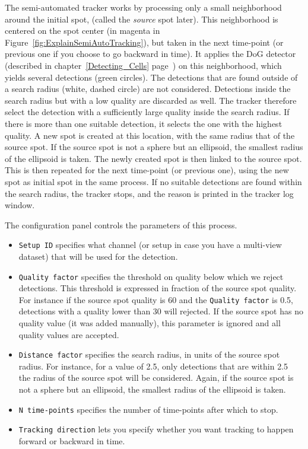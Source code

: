 The semi-automated tracker works by processing only a small neighborhood around the initial spot, (called the \textit{source} spot later).
This neighborhood is centered on the spot center (in magenta in Figure~\ref{fig:ExplainSemiAutoTracking}), but taken in the next time-point (or previous one if you choose to go backward in time).
It applies the DoG detector (described in chapter~\ref{Detecting_Cells} page~\pageref{Detection_Cells_DoG_Detector}) on this neighborhood, which yields several detections (green circles).
The detections that are found outside of a search radius (white, dashed circle) are not considered.
Detections inside the search radius but with a low quality are discarded as well.
The tracker therefore select the detection with a sufficiently large quality inside the search radius. 
If there is more than one suitable detection, it selects the one with the highest quality.
A new spot is created at this location, with the same radius that of the source spot. 
If the source spot is not a sphere but an ellipsoid, the smallest radius of the ellipsoid is taken. 
The newly created spot is then linked to the source spot. 
This is then repeated for the next time-point (or previous one), using the new spot as initial spot in the same process.
If no suitable detections are found within the search radius, the tracker stops, and the reason is printed in the tracker log window.

The configuration panel controls the parameters of this process.
\begin{itemize}
    
    \item \texttt{Setup ID} specifies what channel (or setup in case you have a multi-view dataset) that will be used for the detection.
    
    \item \texttt{Quality factor} specifies the threshold on quality below which we reject detections. This threshold is expressed in fraction of the source spot quality. For instance if the source spot quality is 60 and the \texttt{Quality factor} is 0.5, detections with a quality lower than 30 will rejected. If the source spot has no quality value (it was added manually), this parameter is ignored and all quality values are accepted.
    
    \item \texttt{Distance factor} specifies the search radius, in units of the source spot radius. For instance, for a value of 2.5, only detections that are within 2.5 \texttimes\, the radius of the source spot will be considered. Again, if the source spot is not a sphere but an ellipsoid, the smallest radius of the ellipsoid is taken. 
    
    \item \texttt{N time-points} specifies the number of time-points after which to stop.
    
    \item \texttt{Tracking direction} lets you specify whether you want tracking to happen forward or backward in time.
    
\end{itemize}

